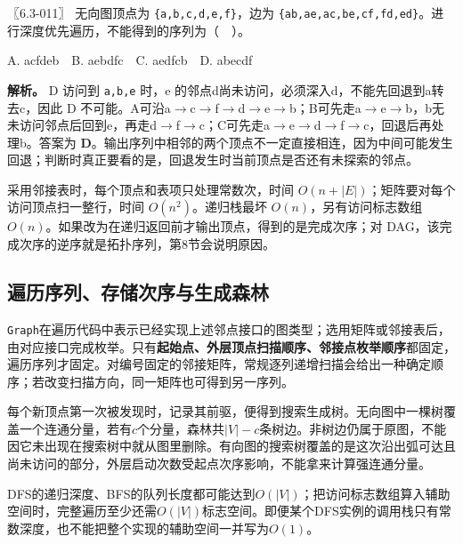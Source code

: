 \begin{example}[配套案例]

〖6.3-011〗 无向图顶点为 \texttt{\{a,\allowbreak{}b,\allowbreak{}c,\allowbreak{}d,\allowbreak{}e,\allowbreak{}f\}}，边为 \texttt{\{ab,\allowbreak{}ae,\allowbreak{}ac,\allowbreak{}be,\allowbreak{}cf,\allowbreak{}fd,\allowbreak{}ed\}}。进行深度优先遍历，不能得到的序列为（　）。

A. acfdeb　B. aebdfc　C. aedfcb　D. abecdf

\end{example}

\textbf{解析。} D 访问到 \texttt{a,\allowbreak{}b,\allowbreak{}e} 时，e 的邻点d尚未访问，必须深入d，不能先回退到a转去c，因此 D 不可能。A可沿a\ensuremath{\to}c\ensuremath{\to}f\ensuremath{\to}d\ensuremath{\to}e\ensuremath{\to}b；B可先走a\ensuremath{\to}e\ensuremath{\to}b，b无未访问邻点后回到e，再走d\ensuremath{\to}f\ensuremath{\to}c；C可先走a\ensuremath{\to}e\ensuremath{\to}d\ensuremath{\to}f\ensuremath{\to}c，回退后再处理b。答案为 \textbf{D}。输出序列中相邻的两个顶点不一定直接相连，因为中间可能发生回退；判断时真正要看的是，回退发生时当前顶点是否还有未探索的邻点。

采用邻接表时，每个顶点和表项只处理常数次，时间 \(O(n+|E|)\)；矩阵要对每个访问顶点扫一整行，时间 \(O(n^2)\)。递归栈最坏 \(O(n)\)，另有访问标志数组 \(O(n)\)。如果改为在递归返回前才输出顶点，得到的是完成次序；对 DAG，该完成次序的逆序就是拓扑序列，第8节会说明原因。

\subsection{遍历序列、存储次序与生成森林}\label{DS06-traversal-order}

\texttt{Graph}在遍历代码中表示已经实现上述邻点接口的图类型；选用矩阵或邻接表后，由对应接口完成枚举。只有\textbf{起始点、外层顶点扫描顺序、邻接点枚举顺序}都固定，遍历序列才固定。对编号固定的邻接矩阵，常规逐列递增扫描会给出一种确定顺序；若改变扫描方向，同一矩阵也可得到另一序列。

每个新顶点第一次被发现时，记录其前驱，便得到搜索生成树。无向图中一棵树覆盖一个连通分量，若有\(c\)个分量，森林共\(|V|-c\)条树边。非树边仍属于原图，不能因它未出现在搜索树中就从图里删除。有向图的搜索树覆盖的是这次沿出弧可达且尚未访问的部分，外层启动次数受起点次序影响，不能拿来计算强连通分量。

DFS的递归深度、BFS的队列长度都可能达到\(O(|V|)\)；把访问标志数组算入辅助空间时，完整遍历至少还需\(O(|V|)\)标志空间。即便某个DFS实例的调用栈只有常数深度，也不能把整个实现的辅助空间一并写为\(O(1)\)。

